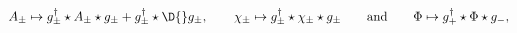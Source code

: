 \begin{equation}\label{eq:gtbf}
 A_{\pm}\mapsto g_\pm^\dagger\star A_{\pm}\star g_\pm+
 g_\pm^\dagger\star\D{} g_\pm,\qquad
 \chi_\pm\mapsto g_\pm^\dagger\star\chi_\pm\star g_\pm
 \qquad\text{and}\qquad \Phi\mapsto g_+^\dagger\star\Phi\star g_-,
\end{equation}

